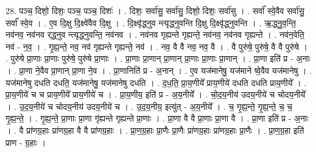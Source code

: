 \documentclass[17pt]{extarticle}
\begin{document}
28. पञ्च॒ दिशो॒ दिशः॒ पञ्च॒ पञ्च॒ दिशः॑ । . दिशः॒ सर्वा॑सु॒ सर्वा॑सु॒ दिशो॒ दिशः॒ सर्वा॑सु । . सर्वा᳚ स्वे॒वैव सर्वा॑सु॒ सर्वा᳚ स्वे॒व । . ए॒व दि॒क्षु दि॒क्ष्वे॑वैव दि॒क्षु । . दि॒क्ष्वृ॑द्ध्नुव न्त्यृद्ध्नुवन्ति दि॒क्षु दि॒क्ष्वृ॑द्ध्नुवन्ति । . ऋ॒द्ध्नु॒व॒न्ति॒ नव॑नव॒ नव॑नव र्‌द्ध्नुव न्त्यृद्ध्नुवन्ति॒ नव॑नव । . नव॑नव गृह्यन्ते गृह्यन्ते॒ नव॑नव॒ नव॑नव गृह्यन्ते । . नव॑न॒वेति॒ नव॑ - न॒व॒ । . गृ॒ह्य॒न्ते॒ नव॒ नव॑ गृह्यन्ते गृह्यन्ते॒ नव॑ । . नव॒ वै वै नव॒ नव॒ वै । . वै पुरु॑षे॒ पुरु॑षे॒ वै वै पुरु॑षे । . पुरु॑षे प्रा॒णाः प्रा॒णाः पुरु॑षे॒ पुरु॑षे प्रा॒णाः । . प्रा॒णाः प्रा॒णान् प्रा॒णान् प्रा॒णाः प्रा॒णाः प्रा॒णान् । . प्रा॒णा इति॑ प्र - अ॒नाः । . प्रा॒णा ने॒वैव प्रा॒णान् प्रा॒णा ने॒व । . प्रा॒णानिति॑ प्र - अ॒नान् । . ए॒व यज॑मानेषु॒ यज॑माने ष्वे॒वैव यज॑मानेषु । . यज॑मानेषु दधति दधति॒ यज॑मानेषु॒ यज॑मानेषु दधति । . द॒ध॒ति॒ प्रा॒य॒णीये᳚ प्राय॒णीये॑ दधति दधति प्राय॒णीये᳚ । . प्रा॒य॒णीये॑ च च प्राय॒णीये᳚ प्राय॒णीये॑ च । . प्रा॒य॒णीय॒ इति॑ प्र - अ॒य॒नीये᳚ । . चो॒द॒य॒नीय॑ उदय॒नीये॑ च चोदय॒नीये᳚ । . उ॒द॒य॒नीये॑ च चोदय॒नीय॑ उदय॒नीये॑ च । . उ॒द॒य॒नीय॒ इत्यु॑त् - अ॒य॒नीये᳚ । . च॒ गृ॒ह्य॒न्ते॒ गृ॒ह्य॒न्ते॒ च॒ च॒ गृ॒ह्य॒न्ते॒ । . गृ॒ह्य॒न्ते॒ प्रा॒णाः प्रा॒णा गृ॑ह्यन्ते गृह्यन्ते प्रा॒णाः । . प्रा॒णा वै वै प्रा॒णाः प्रा॒णा वै । . प्रा॒णा इति॑ प्र - अ॒नाः । . वै प्रा॑णग्र॒हाः प्रा॑णग्र॒हा वै वै प्रा॑णग्र॒हाः । . प्रा॒ण॒ग्र॒हाः प्रा॒णैः प्रा॒णैः प्रा॑णग्र॒हाः प्रा॑णग्र॒हाः प्रा॒णैः । . प्रा॒ण॒ग्र॒हा इति॑ प्राण - ग्र॒हाः । \newline
\end{document}

